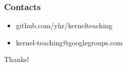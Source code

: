 \documentclass{beamer}
\begin{document}
\begin{frame}
\frametitle{Contacts}
\begin{itemize}
	\item github.com/yhr/kernelteaching
	\item kernel-teaching@googlegroups.com
\end{itemize}
\end{frame}


\begin{frame}
\Huge{\centerline{Thanks!}}
\end{frame}
\end{document}

